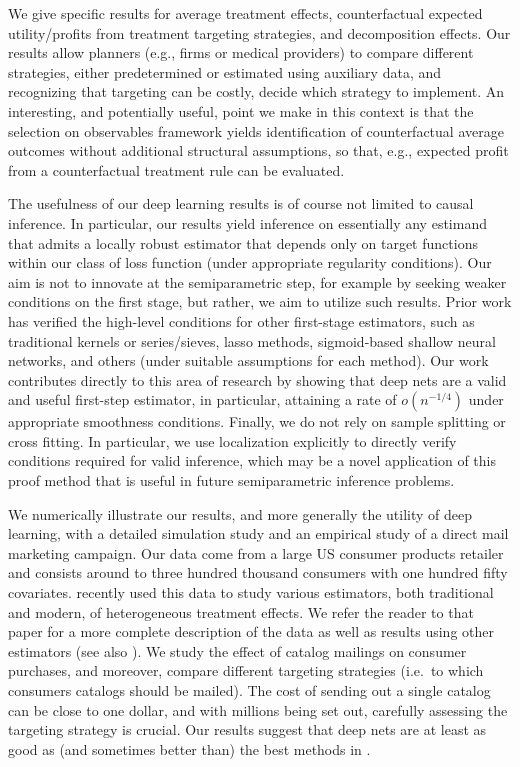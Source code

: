 \documentclass[11pt]{article}
\numberwithin{equation}{section}
\theoremstyle{definition}
\begin{document}
We give specific results for average treatment effects, counterfactual expected utility/profits from treatment targeting strategies, and decomposition effects. Our results allow planners (e.g., firms or medical providers) to compare different strategies, either predetermined or estimated using auxiliary data, and recognizing that targeting can be costly, decide which strategy to implement. An interesting, and potentially useful, point we make in this context is that the selection on observables framework yields identification of counterfactual average outcomes without additional structural assumptions, so that, e.g., expected profit from a counterfactual treatment rule can be evaluated.




The usefulness of our deep learning results is of course not limited to causal inference. In particular, our results yield inference on essentially any estimand that admits a locally robust estimator \citep{Chernozhukov-etal2018_WP} that depends only on target functions within our class of loss function (under appropriate regularity conditions). Our aim is not to innovate at the semiparametric step, for example by seeking weaker conditions on the first stage, but rather, we aim to utilize such results. Prior work has verified the high-level conditions for other first-stage estimators, such as traditional kernels or series/sieves, lasso methods, sigmoid-based shallow neural networks, and others (under suitable assumptions for each method). Our work contributes directly to this area of research by showing that deep nets are a valid and useful first-step estimator, in particular, attaining a rate of $o(n^{-1/4})$ under appropriate smoothness conditions. Finally, we do not rely on sample splitting or cross fitting. In particular, we use localization explicitly to directly verify conditions required for valid inference, which may be a novel application of this proof method that is useful in future semiparametric inference problems.




We numerically illustrate our results, and more generally the utility of deep learning, with a detailed simulation study and an empirical study of a direct mail marketing campaign. Our data come from a large US consumer products retailer and consists around to three hundred thousand consumers with one hundred fifty covariates. \cite{Hitsch-Misra2018_WP} recently used this data to study various estimators, both traditional and modern, of heterogeneous treatment effects. We refer the reader to that paper for a more complete description of the data as well as results using other estimators (see also \cite{Hansen-Kozbur-Misra2017_WP}). We study the effect of catalog mailings on consumer purchases, and moreover, compare different targeting strategies (i.e.\ to which consumers catalogs should be mailed). The cost of sending out a single catalog can be close to one dollar, and with millions being set out, carefully assessing the targeting strategy is crucial. Our results suggest that deep nets are at least as good as (and sometimes better than) the best methods in \cite{Hitsch-Misra2018_WP}. 
\end{document}
